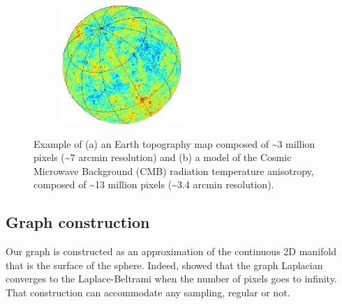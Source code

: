 \documentclass[final,twocolumn,3p,times,authoryear]{elsarticle}
\newcommand{\1}{\b{1}}              %
\newcommand{\0}{\b{0}}              %
\begin{document}
\begin{figure}
\begin{subfigure}[b]{0.45\linewidth}
		\includegraphics[width=\linewidth]{figures/exampleCMB}
		\caption{}
		\label{fig:example_cmb}
	\end{subfigure}
	\caption[]{Example of (a) an Earth topography map composed of \textasciitilde 3 million pixels (\textasciitilde 7 arcmin resolution) and (b) a model of the Cosmic Microwave Background (CMB) radiation temperature anisotropy, composed of \textasciitilde 13 million pixels (\textasciitilde 3.4 arcmin resolution).\footnotemark}
	\label{fig:example_maps}
\end{figure}


\subsection{Graph construction}

Our graph is constructed as an approximation of the continuous 2D manifold that is the surface of the sphere. Indeed, \citet{belkin2007convergence} showed that the graph Laplacian converges to the Laplace-Beltrami when the number of pixels goes to infinity. That construction can accommodate any sampling, regular or not.
\end{document}

